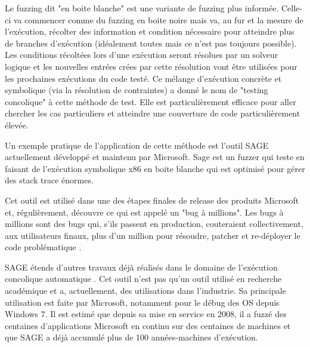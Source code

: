 \documentclass[a4paper]{report}
\begin{document}
Le fuzzing dit "en boite blanche" est une variante de fuzzing plus informée.
Celle-ci va commencer comme du fuzzing en boite noire mais va, au fur et la mesure de l'exécution, récolter des information et condition nécessaire pour atteindre plus de branches d'exécution (idéalement toutes mais ce n'est pas toujours possible).
Les conditions récoltées lors d'une exécution seront résolues par un solveur logique et les nouvelles entrées crées par cette résolution vont être utilisées pour les prochaines exécutions du code testé.
Ce mélange d'exécution concrète et symbolique (via la résolution de contraintes) a donné le nom de "testing concolique" à cette méthode de test.
Elle est particulièrement efficace pour aller chercher les cas particuliers et atteindre une couverture de code particulièrement élevée.

Un exemple pratique de l'application de cette méthode est l'outil SAGE actuellement développé et maintenu par Microsoft\cite{godefroid2008automated}.
Sage est un fuzzer qui teste en faisant de l'exécution symbolique x86 en boite blanche qui est optimisé pour gérer des stack trace énormes\cite{Godefroid2020}.

Cet outil est utilisé dans une des étapes finales de release des produits Microsoft et, régulièrement, découvre ce  qui est appelé un "bug à millions".
Les bugs à millions sont des bugs qui, s’ils passent en production, couteraient collectivement, aux utilisateurs finaux, plus d'un million pour résoudre, patcher et re-déployer le code problématique \cite{Godefroid2012}.

SAGE étends d'autres travaux déjà réalisés dans le domaine de l'exécution concolique automatique\cite{Godefroid2020} \cite{cadar2005execution} \cite{godefroid2005dart}.
Cet outil n'est pas qu'un outil utilisé en recherche académique et a, actuellement, des utilisations dans l'industrie.
Sa principale utilisation est faite par Microsoft, notamment pour le débug des OS depuis Windows 7.
Il est estimé que depuis sa mise en service en 2008, il a fuzzé des centaines d'applications Microsoft en continu sur des centaines de machines et que SAGE a déjà accumulé plus de 100 années-machines d'exécution\cite{Godefroid2012}.
\end{document}
